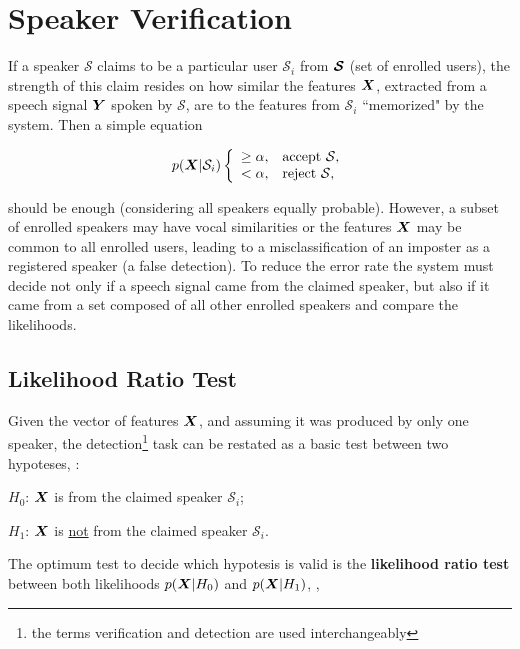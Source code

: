 \section{Speaker Verification}
\label{sec:speaker-verification}

If a speaker $\mathcal{S}$ claims to be a particular user $\mathcal{S}_i$ from $\boldsymbol{\mathcal{S}}$ (set of enrolled users), the strength of this claim resides on how similar the features $\boldsymbol{X}$, extracted from a speech signal $\boldsymbol{Y}$ spoken by $\mathcal{S}$, are to the features from $\mathcal{S}_i$ ``memorized" by the system. Then a simple equation

\begin{equation}
    \postpdf{\boldsymbol{X}}{\mathcal{S}_i} \verifytestB{\alpha}{\mathcal{S}}
    \label{eq:decision_speaker_verification}
\end{equation}

\noindent should be enough (considering all speakers equally probable). However, a subset of enrolled speakers may have vocal similarities or the features $\boldsymbol{X}$ may be common to all enrolled users, leading to a misclassification of an imposter as a registered speaker (a false detection). To reduce the error rate the system must decide not only if a speech signal came from the claimed speaker, but also if it came from a set composed of all other enrolled speakers and compare the likelihoods.

\subsection{Likelihood Ratio Test}

Given the vector of features $\boldsymbol{X}$, and assuming it was produced by only one speaker, the detection\footnote{the terms verification and detection are used interchangeably} task can be restated as a basic test between two hypoteses, :

\begin{description}\itemsep0pt
    \item $H_0$: $\boldsymbol{X}$ is from the claimed speaker $\mathcal{S}_i$;
    \item $H_1$: $\boldsymbol{X}$ is \underline{not} from the claimed speaker $\mathcal{S}_i$.
\end{description}

\noindent The optimum test to decide which hypotesis is valid is the \textbf{likelihood ratio test} between both likelihoods $p(\boldsymbol{X}|H_0)$ and $p(\boldsymbol{X}|H_1)$, ,

